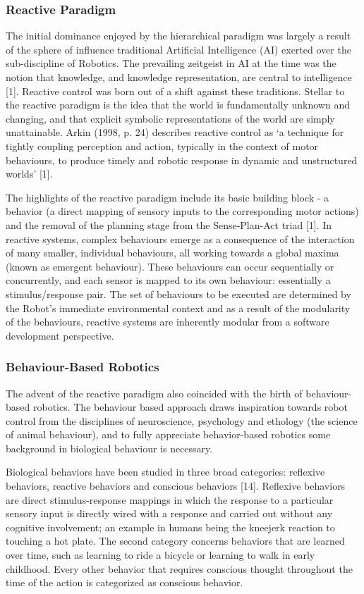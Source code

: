 \documentclass{article}
\begin{document}
\begin{multicols}{2}
	\subsubsection{Reactive Paradigm}
	The initial dominance enjoyed by the hierarchical paradigm was largely a result of the sphere of influence traditional Artificial Intelligence (AI) exerted over the sub-discipline of Robotics. The prevailing zeitgeist in AI at the time was the notion that knowledge, and knowledge representation, are central to intelligence [1]. Reactive control was born out of a shift against these traditions. Stellar to the reactive paradigm is the idea that the world is fundamentally unknown and changing, and that explicit symbolic representations of the world are simply unattainable. Arkin (1998, p. 24) describes reactive control as ‘a technique for tightly coupling perception and action, typically in the context of motor behaviours, to produce timely and robotic response in dynamic and unstructured worlds’ [1].

The highlights of the reactive paradigm include its basic building block - a behavior (a direct mapping of sensory inputs to the corresponding motor actions) and the removal of the planning stage from the Sense-Plan-Act triad [1]. In reactive systems, complex behaviours emerge as a consequence of the interaction of many smaller, individual behaviours, all working towards a global maxima (known as emergent behaviour). These behaviours can occur sequentially or concurrently, and each sensor is mapped to its own behaviour: essentially a stimulus/response pair. The set of behaviours to be executed are determined by the Robot’s immediate environmental context and as a result of the modularity of the behaviours, reactive systems are inherently modular from a software development perspective.

	\subsubsection{Behaviour-Based Robotics}
	The advent of the reactive paradigm also coincided with the birth of behaviour-based robotics. The behaviour based approach draws inspiration towards robot control from the disciplines of neuroscience, psychology and ethology (the science of animal behaviour), and to fully appreciate behavior-based robotics some background in biological behaviour is necessary.

Biological behaviors have been studied in three broad categories: reflexive behaviors, reactive behaviors and conscious behaviors [14]. Reflexive behaviors are direct stimulus-response mappings in which the response to a particular sensory input is directly wired with a response and carried out without any cognitive involvement; an example in humans being the kneejerk reaction to touching a hot plate. The second category concerns behaviors that are learned over time, such as learning to ride a bicycle or learning to walk in early childhood. Every other behavior that requires conscious thought throughout the time of the action is categorized as conscious behavior. 


\end{multicols}
\end{document}
